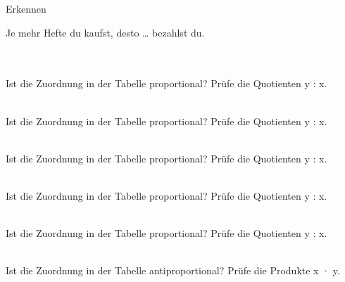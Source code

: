 \begin{aufgabe}{Erkennen}
\begin{teile}
\teil Je mehr Hefte du kaufst, desto … bezahlst du. \\  \\  \\ 
\end{teile}
\begin{teile}
\teil Ist die Zuordnung in der Tabelle proportional? Prüfe die Quotienten y : x. \\  \\ 
\end{teile}
\begin{teile}
\teil Ist die Zuordnung in der Tabelle proportional? Prüfe die Quotienten y : x. \\  \\ 
\end{teile}
\begin{teile}
\teil Ist die Zuordnung in der Tabelle proportional? Prüfe die Quotienten y : x. \\  \\ 
\end{teile}
\begin{teile}
\teil Ist die Zuordnung in der Tabelle proportional? Prüfe die Quotienten y : x. \\  \\ 
\end{teile}
\begin{teile}
\teil Ist die Zuordnung in der Tabelle proportional? Prüfe die Quotienten y : x. \\  \\ 
\end{teile}
\begin{teile}
\teil Ist die Zuordnung in der Tabelle antiproportional? Prüfe die Produkte x · y. \\  \\ 
\end{teile}

\end{aufgabe}

